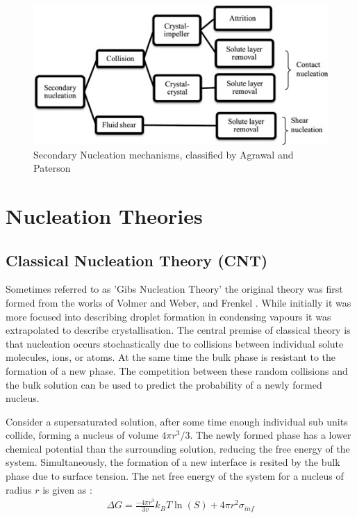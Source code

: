 \begin{figure}[h!]
	\includegraphics[width=\linewidth]{secondary_nucleation.jpg}
	\caption{Secondary Nucleation mechanisms, classified by Agrawal and Paterson \cite{Agrawal2015}}
\end{figure}

\section{Nucleation Theories}
\subsection{Classical Nucleation Theory (CNT)}
Sometimes referred to as 'Gibs Nucleation Theory' the original theory 
was first formed from the works of Volmer and Weber, and Frenkel 
\cite{Frenkel1939, Volmer1926}. While initially it was more focused 
into describing droplet formation in condensing vapours it was 
extrapolated to describe crystallisation. The central premise of 
classical theory is that nucleation occurs stochastically due to 
collisions between individual solute molecules, ions, or atoms. At the 
same time the bulk phase is resistant to the formation of a new phase. 
The competition between these random collisions and the bulk solution 
can be used to predict the probability of a newly formed nucleus.
 
Consider a supersaturated solution, after some time enough individual
sub units collide, forming a nucleus of volume $4\pi r^3/3$. The newly 
formed phase has a lower chemical potential than the surrounding solution, 
reducing the free energy of the system. Simultaneously, the formation of 
a new interface is resited by the bulk phase due to surface tension. 
The net free energy of the system for a nucleus of radius $r$ is given 
as \cite{Karthika2016}:
\begin{align}
	\Delta G = \frac{-4\pi r^3}{3v}k_BT\ln(S) + 4\pi r^{2}\sigma_{inf}
	\label{eq:CNT} 
\end{align}

